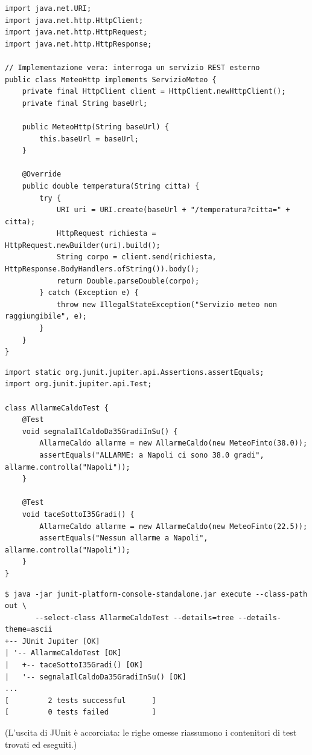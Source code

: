 \begin{lstlisting}[style=java, name=MeteoHttp.java]
import java.net.URI;
import java.net.http.HttpClient;
import java.net.http.HttpRequest;
import java.net.http.HttpResponse;

// Implementazione vera: interroga un servizio REST esterno
public class MeteoHttp implements ServizioMeteo {
    private final HttpClient client = HttpClient.newHttpClient();
    private final String baseUrl;

    public MeteoHttp(String baseUrl) {
        this.baseUrl = baseUrl;
    }

    @Override
    public double temperatura(String citta) {
        try {
            URI uri = URI.create(baseUrl + "/temperatura?citta=" + citta);
            HttpRequest richiesta = HttpRequest.newBuilder(uri).build();
            String corpo = client.send(richiesta, HttpResponse.BodyHandlers.ofString()).body();
            return Double.parseDouble(corpo);
        } catch (Exception e) {
            throw new IllegalStateException("Servizio meteo non raggiungibile", e);
        }
    }
}
\end{lstlisting}

\begin{lstlisting}[style=java, name=AllarmeCaldoTest.java]
import static org.junit.jupiter.api.Assertions.assertEquals;
import org.junit.jupiter.api.Test;

class AllarmeCaldoTest {
    @Test
    void segnalaIlCaldoDa35GradiInSu() {
        AllarmeCaldo allarme = new AllarmeCaldo(new MeteoFinto(38.0));
        assertEquals("ALLARME: a Napoli ci sono 38.0 gradi", allarme.controlla("Napoli"));
    }

    @Test
    void taceSottoI35Gradi() {
        AllarmeCaldo allarme = new AllarmeCaldo(new MeteoFinto(22.5));
        assertEquals("Nessun allarme a Napoli", allarme.controlla("Napoli"));
    }
}
\end{lstlisting}
\begin{lstlisting}[style=shell, name=Terminale, deletestring={[b]'}]
$ java -jar junit-platform-console-standalone.jar execute --class-path out \
       --select-class AllarmeCaldoTest --details=tree --details-theme=ascii
+-- JUnit Jupiter [OK]
| '-- AllarmeCaldoTest [OK]
|   +-- taceSottoI35Gradi() [OK]
|   '-- segnalaIlCaldoDa35GradiInSu() [OK]
...
[         2 tests successful      ]
[         0 tests failed          ]
\end{lstlisting}

\medskip
(L'uscita di JUnit è accorciata: le righe omesse riassumono i contenitori di test trovati ed eseguiti.)

